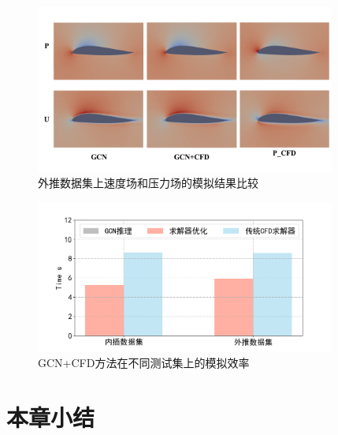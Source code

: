 \begin{figure}[htp]
	\centering
	\includegraphics[width=0.88\textwidth]{figures/gcn_result/chapter4_extend/gcncomp.png}
	\caption{外推数据集上速度场和压力场的模拟结果比较}
	\label{fig:outerresult}
\end{figure}


\begin{figure}[htp]
	\centering
	\includegraphics[width=0.88\textwidth]{figures/gcn_result/time.png}
	\caption{GCN+CFD方法在不同测试集上的模拟效率}
	\label{fig:timeresult}
\end{figure}





\section{本章小结}

